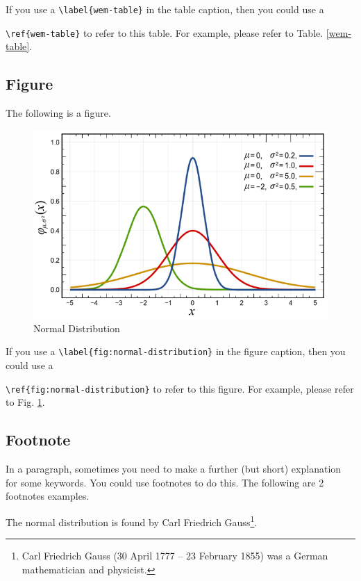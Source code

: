 \documentclass[10pt, a4paper, oneside]{article}
\begin{document}
If you use a \texttt{\textbackslash{}label\{wem-table\}} in the table caption, then you could use a

\texttt{\textbackslash{}ref\{wem-table\}} to refer to this table.
For example, please refer to Table. \ref{wem-table}.

\clearpage

\subsection{Figure}\label{figure}

The following is a figure.

\begin{figure}[htbp]
\centering
\includegraphics{./normal-distribution.png}
\caption{Normal Distribution \label{fig:normal-distribution}}
\end{figure}

If you use a \texttt{\textbackslash{}label\{fig:normal-distribution\}} in the figure caption, then you could use a

\texttt{\textbackslash{}ref\{fig:normal-distribution\}} to refer to this figure.
For example, please refer to Fig. \ref{fig:normal-distribution}.

\subsection{Footnote}\label{footnote}

In a paragraph, sometimes you need to make a further (but short) explanation for some keywords.
You could use footnotes to do this. The following are 2 footnotes examples.

The normal distribution is found by Carl Friedrich Gauss\footnote{Carl Friedrich Gauss (30 April 1777 -- 23 February 1855) was a German mathematician and physicist.}.
\end{document}
